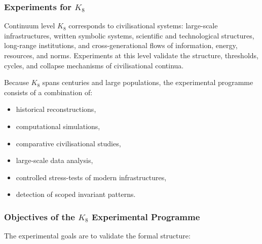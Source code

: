 
\subsubsection{Experiments for \texorpdfstring{$K_8$}{K_8}}
\label{sec:experiments-k8}

Continuum level $K_8$ corresponds to civilisational systems:
large-scale infrastructures, written symbolic systems, scientific
and technological structures, long-range institutions, and 
cross-generational flows of information, energy, resources, and norms.  
Experiments at this level validate the structure, thresholds,
cycles, and collapse mechanisms of civilisational continua.

Because $K_8$ spans centuries and large populations, the
experimental programme consists of a combination of:
\begin{itemize}
    \item historical reconstructions,
    \item computational simulations,
    \item comparative civilisational studies,
    \item large-scale data analysis,
    \item controlled stress-tests of modern infrastructures,
    \item detection of scoped invariant patterns.
\end{itemize}



\subsubsection{Objectives of the \texorpdfstring{$K_8$}{K_8} Experimental Programme}

The experimental goals are to validate the formal structure:

